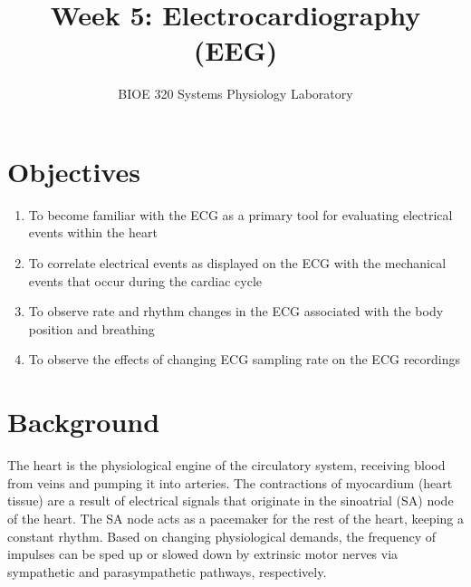 \documentclass{article}
\title{Week 5: Electrocardiography (EEG)}
\author{BIOE 320 Systems Physiology Laboratory}
\date{}
\begin{document}
\large
\maketitle

\section*{Objectives}
\begin{enumerate}
	\item To become familiar with the ECG as a primary tool for evaluating electrical events within the heart
	\item To correlate electrical events as displayed on the ECG with the mechanical events that occur during the cardiac cycle
	\item To observe rate and rhythm changes in the ECG associated with the body position and breathing
	\item To observe the effects of changing ECG sampling rate on the ECG recordings
\end{enumerate}

\section*{Background}
The heart is the physiological engine of the circulatory system, receiving blood from veins and pumping it into arteries. The contractions of myocardium (heart tissue) are a result of electrical signals that originate in the sinoatrial (SA) node of the heart. The SA node acts as a pacemaker for the rest of the heart, keeping a constant rhythm. Based on changing physiological demands, the frequency of impulses can be sped up or slowed down by extrinsic motor nerves via sympathetic and parasympathetic pathways, respectively.
\end{document}
